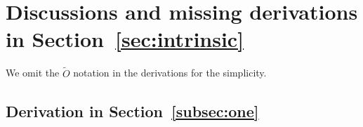 



\section{Discussions and missing derivations in Section~\ref{sec:intrinsic}}\label{sec:missing_dev}

We omit the $\widetilde{O}$ notation in the derivations for the simplicity.

\subsection{Derivation in Section~\ref{subsec:one}}

